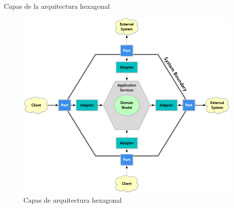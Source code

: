 \documentclass[10pt]{beamer}
\begin{document}
\begin{frame}[fragile]{Capas de la arquitectura hexagonal}
	
	\begin{figure}
		\centering
		\includegraphics[width=0.7\linewidth]{img/hexagonal}
		\caption[clean]{Capas de arquitectura hexagonal}
		\label{fig:hexagonal}
	\end{figure}	
	
\end{frame}
\end{document}
